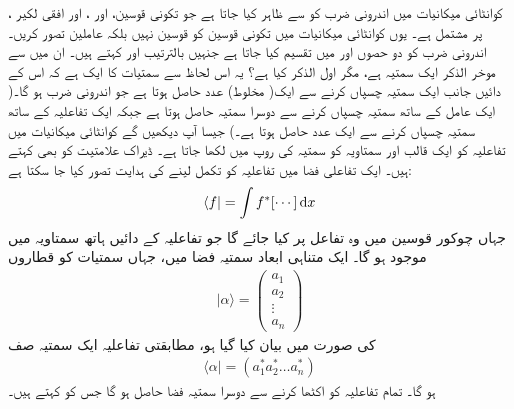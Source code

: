کوانٹائی میکانیات میں اندرونی ضرب کو  سے ظاہر کیا جاتا ہے جو تکونی قوسین،  اور ، اور افقی لکیر ، پر مشتمل ہے۔ یوں کوانٹائی میکانیات میں تکونی قوسین کو قوسین نہیں بلکہ عاملین تصور کریں۔ اندرونی ضرب  کو دو حصوں  اور  میں تقسیم کیا جاتا ہے جنہیں بالترتیب  اور  کہتے ہیں۔ ان میں سے موخر الذکر ایک سمتیہ ہے، مگر اول الذکر کیا ہے؟ یہ اس لحاظ سے سمتیات کا ایک  ہے کہ اس کے دائیں جانب ایک سمتیہ چسپاں کرنے سے ایک( مخلوط) عدد حاصل ہوتا ہے جو اندرونی ضرب ہو گا۔( ایک عامل کے ساتھ سمتیہ چسپاں کرنے سے دوسرا سمتیہ حاصل ہوتا ہے جبکہ ایک تفاعلیہ کے ساتھ سمتیہ چسپاں کرنے سے ایک عدد حاصل ہوتا ہے۔) جیسا آپ دیکھیں گے کوانٹائی میکانیات میں تفاعلیہ کو ایک قالب اور سمتاویہ کو سمتیہ کی روپ میں لکھا جاتا ہے۔ ڈیراک علامتیت کو  بھی کہتے ہیں۔ ایک تفاعلی فضا میں تفاعلیہ کو تکمل لینے کی ہدایت تصور کیا جا سکتا ہے:
\begin{align*}
\langle f | = \int f^{*} [ \cdots ] \dif x
\end{align*}
جہاں چوکور قوسین  میں وہ تفاعل پر کیا جائے گا جو تفاعلیہ کے دائیں ہاتھ سمتاویہ میں موجود ہو گا۔ ایک متناہی ابعاد سمتیہ فضا میں، جہاں سمتیات کو قطاروں 
\begin{align}
| \alpha \rangle = \begin{pmatrix}
a_{1} \\ a_{2} \\ \vdots \\ a_{n} 
\end{pmatrix}
\end{align}
کی صورت میں بیان کیا گیا ہو، مطابقتی تفاعلیہ ایک سمتیہ صف 
\begin{align}
\langle \alpha | = ( a_{1}^{*}a_{2}^{*} \dotsc a_{n}^{*})
\end{align}
ہو گا۔ تمام تفاعلیہ کو اکٹھا کرنے سے دوسرا سمتیہ فضا حاصل ہو گا جس کو کہتے ہیں۔ 


